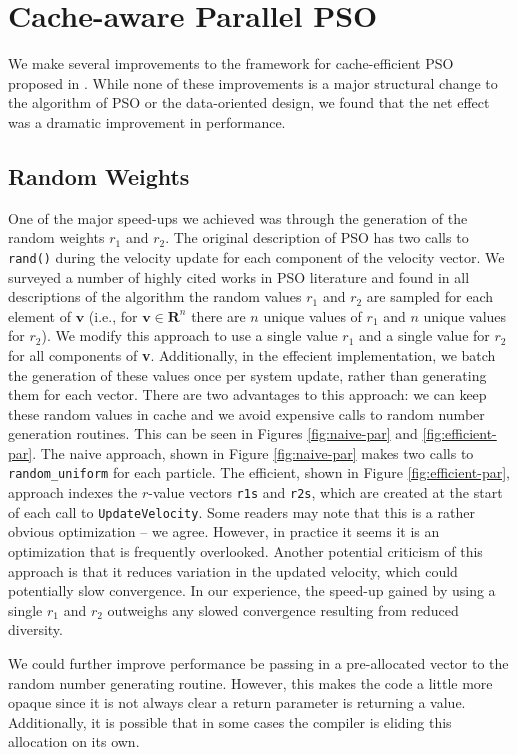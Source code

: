 \section{Cache-aware Parallel PSO}\label{sec:algo}
We make several improvements to the framework for cache-efficient PSO proposed
in \cite{cache-pso}. While none of these improvements is a major structural
change to the algorithm of PSO or the data-oriented design, we found that the
net effect was a dramatic improvement in performance.

\subsection{Random Weights}
One of the major speed-ups we achieved was through
the generation of the random weights $r_1$ and $r_2$. The original description of
PSO \cite{pso} has two calls to \texttt{rand()} during the velocity update for each
component of the velocity vector. We surveyed a number of highly cited works in
PSO literature \cite{pso-development, pso-overview, pso-tutorial} and found in
all descriptions of the algorithm the random values $r_1$ and $r_2$ are sampled
for each element of $\textbf{v}$ (i.e., for $\textbf{v}\in\mathbf{R}^n$ there
are $n$ unique values of $r_1$ and $n$ unique values for $r_2$). We modify this
approach to use a single value $r_1$ and a single value for $r_2$ for all
components of \textbf{v}. Additionally, in the effecient implementation, we batch
the generation of these values once per system update, rather than generating
them for each vector.
There are two advantages to this approach: we can keep
these random values in cache and we avoid expensive calls to random number
generation routines. This can be seen in Figures \ref{fig:naive-par} and
\ref{fig:efficient-par}. The naive approach, shown in Figure \ref{fig:naive-par}
makes two calls to
\texttt{random\_uniform} for each particle. The efficient, shown in Figure
\ref{fig:efficient-par},
approach indexes the $r$-value vectors \texttt{r1s} and \texttt{r2s}, which are
created at the start of each call to \texttt{UpdateVelocity}. Some readers may
note that this is a rather obvious optimization -- we agree. However, in
practice it seems it is an optimization that is frequently overlooked.
Another potential criticism of this approach is that it reduces variation in the
updated velocity, which could potentially slow convergence. In our experience,
the speed-up gained by using a single $r_1$ and $r_2$ outweighs any slowed
convergence resulting from reduced diversity.\par
We could further improve performance be passing in a pre-allocated vector to the
random number generating routine. However, this makes the code a little more
opaque since it is not always clear a return parameter is returning a
value. Additionally, it is possible that in some cases the compiler is eliding
this allocation on its own.


